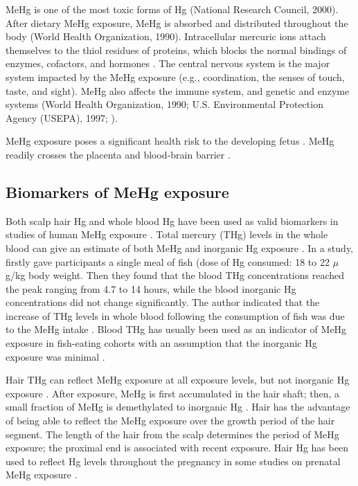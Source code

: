 MeHg is one of the most toxic forms of Hg (National Research Council, 2000). After dietary MeHg exposure, MeHg is absorbed and distributed throughout the body (World Health Organization, 1990). Intracellular mercuric ions attach themselves to the thiol residues of proteins, which blocks the normal bindings of enzymes, cofactors, and hormones \cite{bridges2005molecular}. The central nervous system is the major system impacted by the MeHg exposure (e.g., coordination, the senses of touch, taste, and sight). MeHg also affects the immune system, and genetic and enzyme systems (World Health Organization, 1990; U.S. Environmental Protection Agency (USEPA), 1997; \cite{clarkson2006toxicology}). 

MeHg exposure poses a significant health risk to the developing fetus \cite{bose2010mercury,clarkson2006toxicology,grandjean2010adverse,mergler2007methylmercury}. MeHg readily crosses the placenta and blood-brain barrier \cite{cernichiari1994biological,ramirez2000tagum}. 

\subsection{Biomarkers of MeHg exposure}

Both scalp hair Hg and whole blood Hg have been used as valid biomarkers in studies of human MeHg exposure \cite{clarkson2006toxicology,mergler2007methylmercury}. Total mercury (THg) levels in the whole blood can give an estimate of both MeHg and inorganic Hg exposure \cite{kershaw1980relationship,berglund2005inter,clarkson2006toxicology}. In a study, \cite{kershaw1980relationship} firstly gave participants a single meal of fish (dose of Hg consumed: 18 to 22 \({\mu}\)g/kg body weight. Then they found that the blood THg concentrations reached the peak ranging from 4.7 to 14 hours, while the blood inorganic Hg concentrations did not change significantly. The author indicated that the increase of THg levels in whole blood following the consumption of fish was due to the MeHg intake \cite{kershaw1980relationship}. Blood THg has usually been used as an indicator of MeHg exposure in fish-eating cohorts with an assumption that the inorganic Hg exposure was minimal \cite{schober2003blood,weil2005blood}.

Hair THg can reflect MeHg exposure at all exposure levels, but not inorganic Hg exposure \cite{lindberg2004exposure,berglund2005inter,clarkson2006toxicology}. After exposure, MeHg is first accumulated in the hair shaft; then, a small fraction of MeHg is demethylated to inorganic Hg \cite{berglund2005inter}. Hair has the advantage of being able to reflect the MeHg exposure over the growth period of the hair segment. The length of the hair from the scalp determines the period of MeHg
exposure; the proximal end is associated with recent exposure. Hair Hg has been used to reflect Hg levels throughout the pregnancy in some studies on prenatal MeHg exposure \cite{clarkson2006toxicology}.

